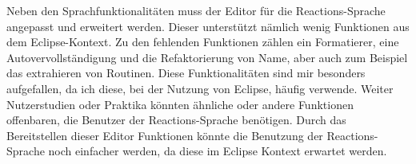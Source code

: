 \documentclass[ngerman,runningheads]{llncs}
\begin{document}
Neben den Sprachfunktionalitäten muss der Editor für die Reactions-Sprache angepasst und erweitert werden. Dieser unterstützt nämlich wenig Funktionen aus dem Eclipse-Kontext. Zu den fehlenden Funktionen zählen ein Formatierer, eine Autovervollständigung und die Refaktorierung von Name, aber auch zum Beispiel das extrahieren von Routinen. Diese Funktionalitäten sind mir besonders aufgefallen, da ich diese, bei der Nutzung von Eclipse, häufig verwende. Weiter Nutzerstudien oder Praktika könnten ähnliche oder andere Funktionen offenbaren, die Benutzer der Reactions-Sprache benötigen. Durch das Bereitstellen dieser Editor Funktionen könnte die Benutzung der Reactions-Sprache noch einfacher werden, da diese im Eclipse Kontext erwartet werden.\par
\end{document}
